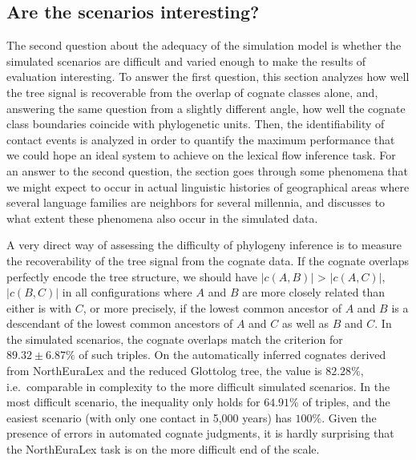 \subsection{Are the scenarios interesting?}
The second question about the adequacy of the simulation model is whether the simulated scenarios are difficult and varied enough to make the results of evaluation interesting. To answer the first question, this section analyzes how well the tree signal is recoverable from the overlap of cognate classes alone, and, answering the same question from a slightly different angle, how well the cognate class boundaries coincide with phylogenetic units. Then, the identifiability of contact events is analyzed in order to quantify the maximum performance that we could hope an ideal system to achieve on the lexical flow inference task. For an answer to the second question, the section goes through some phenomena that we might expect to occur in actual linguistic histories of geographical areas where several language families are neighbors for several millennia, and discusses to what extent these phenomena also occur in the simulated data.

A very direct way of assessing the difficulty of phylogeny inference is to measure the recoverability of the tree signal from the cognate data. If the cognate overlaps perfectly encode the tree structure, we should have $|c(A,B)|$ > $|c(A,C)|$, $|c(B,C)|$ in all configurations where $A$ and $B$ are more closely related than either is with $C$, or more precisely, if the lowest common ancestor of $A$ and $B$ is a descendant of the lowest common ancestors of $A$ and $C$ as well as $B$ and $C$. In the simulated scenarios, the cognate overlaps match the criterion for $89.32 \pm 6.87\%$ of such triples. On the automatically inferred cognates derived from NorthEuraLex and the reduced Glottolog tree, the value is $82.28\%$, i.e.\ comparable in complexity to the more difficult simulated scenarios. In the most difficult scenario, the inequality only holds for $64.91\%$ of triples, and the easiest scenario (with only one contact in 5,000 years) has $100\%$. Given the presence of errors in automated cognate judgments, it is hardly surprising that the NorthEuraLex task is on the more difficult end of the scale.

